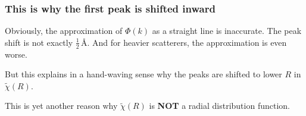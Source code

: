 \documentclass[10pt, xcolor=x11names, compress]{beamer}
\begin{document}
\begin{frame}
  \frametitle{This is why the first peak is shifted inward}
  Obviously, the approximation of $\Phi(k)$ as a straight line is
  inaccurate.  The peak shift is not exactly $\frac{1}{2}$\,\AA.  And
  for heavier scatterers, the approximation is even worse.

  \bigskip

  But this explains in a hand-waving sense why the peaks are shifted
  to lower $R$ in $\tilde\chi(R)$.

  \bigskip

  This is yet another reason why $\tilde\chi(R)$ is \textbf{NOT} a
  radial distribution function.
\end{frame}
\end{document}
